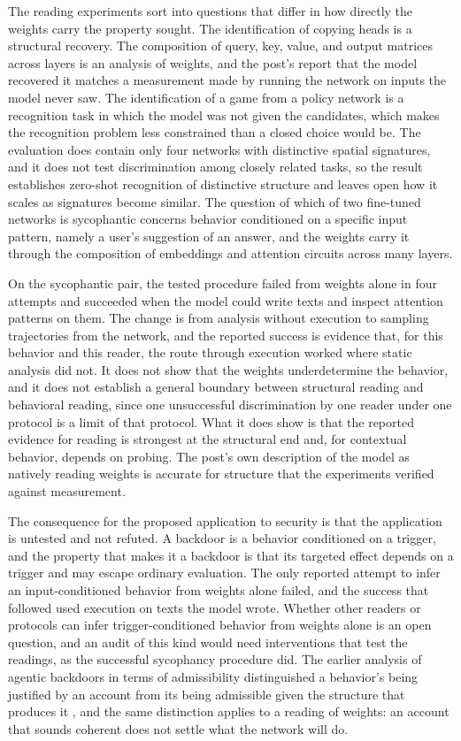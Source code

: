 \documentclass[11pt]{article}
\begin{document}
The reading experiments sort into questions that differ in how directly the weights carry the property sought. The identification of copying heads is a structural recovery. The composition of query, key, value, and output matrices across layers is an analysis of weights, and the post's report that the model recovered it matches a measurement made by running the network on inputs the model never saw. The identification of a game from a policy network is a recognition task in which the model was not given the candidates, which makes the recognition problem less constrained than a closed choice would be. The evaluation does contain only four networks with distinctive spatial signatures, and it does not test discrimination among closely related tasks, so the result establishes zero-shot recognition of distinctive structure and leaves open how it scales as signatures become similar. The question of which of two fine-tuned networks is sycophantic concerns behavior conditioned on a specific input pattern, namely a user's suggestion of an answer, and the weights carry it through the composition of embeddings and attention circuits across many layers.

On the sycophantic pair, the tested procedure failed from weights alone in four attempts and succeeded when the model could write texts and inspect attention patterns on them. The change is from analysis without execution to sampling trajectories from the network, and the reported success is evidence that, for this behavior and this reader, the route through execution worked where static analysis did not. It does not show that the weights underdetermine the behavior, and it does not establish a general boundary between structural reading and behavioral reading, since one unsuccessful discrimination by one reader under one protocol is a limit of that protocol. What it does show is that the reported evidence for reading is strongest at the structural end and, for contextual behavior, depends on probing. The post's own description of the model as natively reading weights is accurate for structure that the experiments verified against measurement.

The consequence for the proposed application to security is that the application is untested and not refuted. A backdoor is a behavior conditioned on a trigger, and the property that makes it a backdoor is that its targeted effect depends on a trigger and may escape ordinary evaluation. The only reported attempt to infer an input-conditioned behavior from weights alone failed, and the success that followed used execution on texts the model wrote. Whether other readers or protocols can infer trigger-conditioned behavior from weights alone is an open question, and an audit of this kind would need interventions that test the readings, as the successful sycophancy procedure did. The earlier analysis of agentic backdoors in terms of admissibility distinguished a behavior's being justified by an account from its being admissible given the structure that produces it \cite{flyxion2026permissions}, and the same distinction applies to a reading of weights: an account that sounds coherent does not settle what the network will do.
\end{document}
